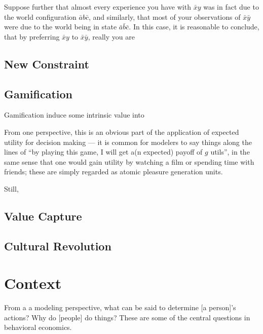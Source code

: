 \documentclass{book}
\begin{document}
	Suppose further that almost every experience you have with $\bar x y$ was in fact due to the world configuration $\bar a b \bar c$, and similarly, that most of your observations of $\bar x \bar y$ were due to the world being in state $\bar a \bar b \bar c$. In this case, it is reasonable to conclude, that by preferring $\bar x y$ to $\bar x \bar y$, really you are 
	
	
	\section{New Constraint}
	
	\section{Gamification}
	Gamification induce some intrinsic value into 
	
	From one perspective, this is an obvious part of the application of expected utility for decision making --- it is common for modelers to say things along the lines of ``by playing this game, I will get a(n expected) payoff of $g$ utils'', in the same sense that one would gain utility by watching a film or spending time with friends; these are simply regarded as atomic pleasure generation units.
	
	Still, 
	
	\section{Value Capture}
	
	
	\section{Cultural Revolution}
	
	
	
	
	

	\chapter{Context}
	From a a modeling perspective, what can be said to determine [a person]'s actions? Why do [people] do things? These are some of the central questions in behavioral economics. 
	
\end{document}
